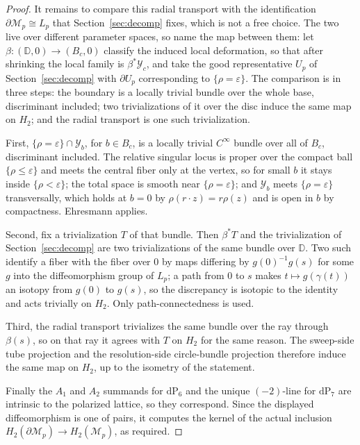 \documentclass[11pt]{amsart}
\theoremstyle{definition}
\theoremstyle{remark}
\theoremstyle{plain}
\newcommand{\Mil}{\mathcal{M}}  %
\newcommand{\dP}{\mathrm{dP}}
\newcommand{\Disk}{\mathbb{D}}
\begin{document}
\begin{proof}
It remains to compare this radial transport with the identification
$\partial \Mil_p\cong L_p$ that Section~\ref{sec:decomp} fixes, which is not a
free choice.  The two live over different parameter spaces, so name the map
between them: let $\beta\colon(\Disk,0)\to(B_c,0)$ classify the induced
local deformation, so that after shrinking the local family is
$\beta^{*}\mathcal Y_c$, and take the good representative $U_p$ of
Section~\ref{sec:decomp} with $\partial U_p$ corresponding to
$\{\rho=\varepsilon\}$.  The comparison is in three steps: the boundary is a
locally trivial bundle over the whole base, discriminant included; two
trivializations of it over the disc induce the same map on $H_2$; and the
radial transport is one such trivialization.

First, $\{\rho=\varepsilon\}\cap\mathcal Y_b$, for $b\in B_c$, is a locally
trivial $C^\infty$ bundle over all of $B_c$, discriminant included.  The
relative singular locus is proper over the compact ball
$\{\rho\le\varepsilon\}$ and meets the central fiber only at the vertex, so
for small $b$ it stays inside $\{\rho<\varepsilon\}$; the total space is
smooth near $\{\rho=\varepsilon\}$; and $\mathcal Y_b$ meets
$\{\rho=\varepsilon\}$ transversally, which holds at $b=0$ by
$\rho(r\cdot z)=r\rho(z)$ and is open in $b$ by compactness.  Ehresmann
applies.

Second, fix a trivialization $T$ of that bundle.  Then $\beta^{*}T$ and the
trivialization of Section~\ref{sec:decomp} are two trivializations of the
same bundle over $\Disk$.  Two such identify a fiber with the fiber over
$0$ by maps differing by $g(0)^{-1}g(s)$ for some $g$ into the
diffeomorphism group of $L_p$; a path from $0$ to $s$ makes
$t\mapsto g(\gamma(t))$ an isotopy from $g(0)$ to $g(s)$, so the
discrepancy is isotopic to the identity and acts trivially on $H_2$.  Only
path-connectedness is used.

Third, the radial transport trivializes the same bundle over the ray
through $\beta(s)$, so on that ray it agrees with $T$ on $H_2$ for the same
reason.  The sweep-side tube projection and the resolution-side
circle-bundle projection therefore induce the same map on $H_2$, up to the
isometry of
the statement.

Finally the $A_1$ and $A_2$ summands for $\dP_6$ and the unique
$(-2)$-line for $\dP_7$ are intrinsic to the polarized lattice, so
they correspond.  Since the displayed diffeomorphism is one of pairs,
it computes the kernel of the actual inclusion
$H_2(\partial \Mil_p)\to H_2(\Mil_p)$, as required.
\end{proof}
\end{document}

